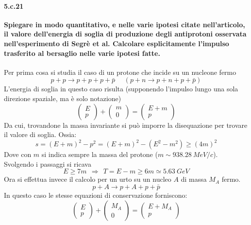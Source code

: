 \documentclass[twoside]{article}
\begin{document}
\paragraph{5.c.21}\textbf{Spiegare in modo quantitativo, e nelle varie ipotesi citate nell'articolo, il valore dell'energia di soglia di produzione degli antiprotoni osservata nell’esperimento di Segrè et al. Calcolare esplicitamente l'impulso trasferito al bersaglio nelle varie ipotesi fatte.}\\
\\
Per prima cosa si studia il caso di un protone che incide su un nucleone fermo
\begin{equation}
    p+p \to p+p+p+\bar{p} \ \ \ \ \ \ (p+n \to p+n+p+\bar{p})
\end{equation}
L'energia di soglia in questo caso risulta (supponendo l'impulso lungo una sola direzione spaziale, ma è solo notazione)
\begin{equation}
   \left( \begin{array}{lr}
         E  \\
         p 
    \end{array}\right)
    +
    \left( \begin{array}{lr}
         m  \\
         0 
    \end{array}\right)=\left(\begin{array}{lr}
         E+m  \\
         p 
    \end{array}\right)
\end{equation}
Da cui, trovandone la massa invariante si può imporre la disequazione per trovare il valore di soglia. Ossia:
\begin{equation}
    s=(E+m)^2-p^2=(E+m)^2-(E^2-m^2)\geq (4m)^2
\end{equation}
Dove con $m$ si indica sempre la massa del protone ($m\sim 938.28 \ MeV/c$).
\\
Svolgendo i passaggi si ricava
\begin{equation}
    E\geq 7m \ \ \Rightarrow \ \ T=E-m\geq 6m \simeq 5.63 \ GeV
\end{equation}
Ora si effettua invece il calcolo per un urto su un nucleo $A$ di massa $M_A$ fermo.
\begin{equation}
    p+A\to p+A+p+\bar{p}
\end{equation}
In questo caso le stesse equazioni di conservazione forniscono:
\begin{equation}
     \left( \begin{array}{lr}
         E  \\
         p 
    \end{array}\right)
    +
    \left( \begin{array}{lr}
         M_A  \\
         0 
    \end{array}\right)=\left(\begin{array}{lr}
         E+M_A  \\
         p 
    \end{array}\right)
\end{equation}
\end{document}
